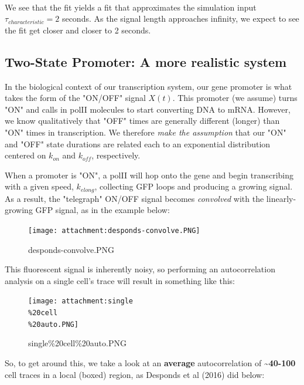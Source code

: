 \documentclass[11pt]{article}
\begin{document}
    \begin{center}
    \end{center}
    { \hspace*{\fill} \\}
    
    We see that the fit yields a fit that approximates the simulation input
\(\tau_{characteristic} = 2\) seconds. As the signal length approaches
infinity, we expect to see the fit get closer and closer to 2 seconds.

    \subsection{Two-State Promoter: A more realistic
system}\label{two-state-promoter-a-more-realistic-system}

In the biological context of our transcription system, our gene promoter
is what takes the form of the "ON/OFF" signal \(X(t)\). This promoter
(we assume) turns "ON" and calls in polII molecules to start converting
DNA to mRNA. However, we know qualitatively that "OFF" times are
generally different (longer) than "ON" times in transcription. We
therefore \emph{make the assumption} that our "ON" and "OFF" state
durations are related each to an exponential distribution centered on
\(k_{on}\) and \(k_{off}\), respectively.

When a promoter is "ON", a polII will hop onto the gene and begin
transcribing with a given speed, \(k_{elong}\), collecting GFP loops and
producing a growing signal. As a result, the "telegraph" ON/OFF signal
becomes \emph{convolved} with the linearly-growing GFP signal, as in the
example below:

\begin{figure}
\centering
\texttt{[image: attachment:desponds-convolve.PNG]}
\caption{desponds-convolve.PNG}
\end{figure}

This fluorescent signal is inherently noisy, so performing an
autocorrelation analysis on a single cell's trace will result in
something like this:

\begin{figure}
\centering
\texttt{[image: attachment:single\\\%20cell\\\%20auto.PNG]}
\caption{single\%20cell\%20auto.PNG}
\end{figure}

So, to get around this, we take a look at an \textbf{average}
autocorrelation of \textbf{\textasciitilde{}40-100} cell traces in a
local (boxed) region, as Desponds et al (2016) did below:
\end{document}
